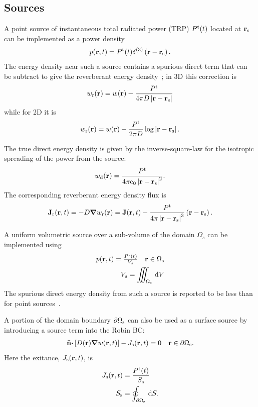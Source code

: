 \documentclass[a4paper]{article}
\numberwithin{equation}{section}
\providecommand\oiint{\oint}
\begin{document}
\subsection[Sources]{Sources}
\label{sc:sum:src}

A point source of instantaneous total radiated power (TRP) $P^\rt(t)$
located at $\vr_\rs$ can be implemented as a power density
\begin{align}
p\prt = P^\rt(t) \delta^{(3)}\left(\vr-\vr_\rs\right).
\end{align}
The energy density near such a source contains a spurious direct term that can
be subtract to give the reverberant energy density~\citep{Visentin2012}; in 3D this correction is
\begin{align}
w_\rr\pr = w\pr - \frac{P^\rt}{4\pi D\left|\vr-\vr_\rs\right|}
\end{align}
while for 2D it is
\begin{align}
w_\rr\pr = w\pr - \frac{P^\rt}{2\pi D} \log \left|\vr-\vr_\rs\right|.
\end{align}

The true direct energy density is given by the inverse-square-law for the
isotropic spreading of the power from the source:
\begin{align}
w_\rd\pr = \frac{P^\rt}{4\pi\rc_0\left|\vr-\vr_\rs\right|^2}.
\end{align}
The corresponding reverberant energy density flux is
\begin{align}
\vJ_\rr\prt = -D\vnabla w_\rr\pr = \vJ\prt - \frac{P^\rt}{4\pi\left|\vr-\vr_\rs\right|^3}\left(\vr-\vr_\rs\right).
\end{align}

A uniform volumetric source over a sub-volume of the domain $\Omega_s$ can be implemented
using
\begin{align}
\begin{matrix} 
p\prt = \frac{P^\rt(t)}{V_s} &\vr\in\Omega_\rs 
\end{matrix} \\
V_s = \iiint_{\Omega_\rs}\dif{V}
\end{align}
The spurious direct energy density from such a source is reported to be less than for point
sources~\citep{Visentin2012}.

A portion of the domain boundary $\partial\Omega_\rs$ can also be used as a
surface source by introducing a source term into the Robin BC:
\begin{align}
\begin{matrix}
\uvn\vcdot\left[D\pr\vnabla w\prt\right] - J_\rs\prt = 0 &\vr\in\partial\Omega_\rs.
\end{matrix}
\end{align}
Here the exitance, $J_\rs\prt$, is
\begin{align}
J_\rs\prt &= \frac{P^\rt(t)}{S_\rs} \\
S_\rs &= \oiint_{\partial\Omega_\rs}\dif{S} .
\end{align}
\end{document}
